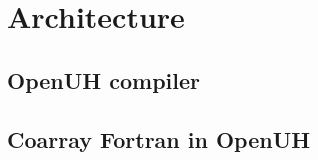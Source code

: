 \chapter{Architecture}\label{chap:Methods }
\section{OpenUH compiler}
\section{Coarray Fortran in OpenUH}